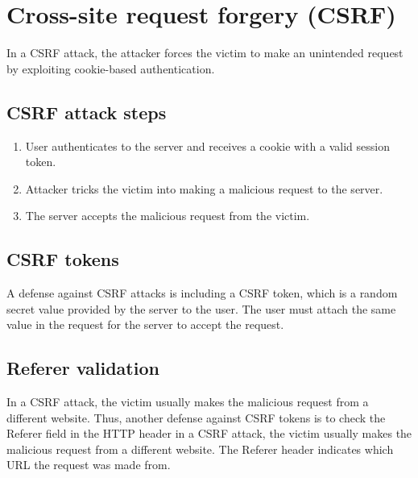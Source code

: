 \section{Cross-site request forgery (CSRF)}
In a CSRF attack, the attacker forces the victim to make an unintended request by exploiting cookie-based authentication.

\subsection{CSRF attack steps}
\begin{enumerate}
    \item User authenticates to the server and receives a cookie with a valid session token.
    \item Attacker tricks the victim into making a malicious request to the server.
    \item The server accepts the malicious request from the victim.
\end{enumerate}

\subsection{CSRF tokens}
A defense against CSRF attacks is including a CSRF token, which is a random secret value provided by the server to the user. The user must attach the same value in the request for the server to accept the request.

\subsection{Referer validation}
In a CSRF attack, the victim usually makes the malicious request from a different website. Thus, another defense against CSRF tokens is to check the Referer field in the HTTP header in a CSRF attack, the victim usually makes the malicious request from a different website. The Referer header indicates which URL the request was made from.